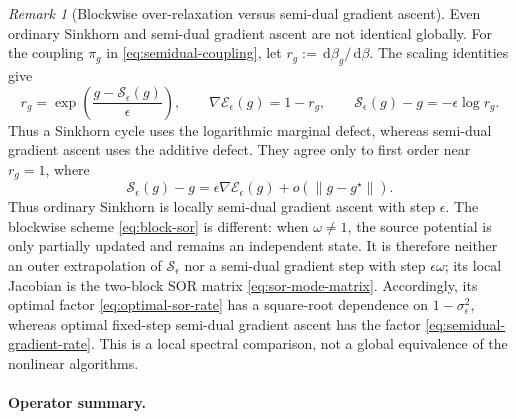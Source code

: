 \documentclass[11pt]{article}
\theoremstyle{definition}
\theoremstyle{remark}
\newtheorem{remark}[proposition]{Remark}
\newcommand{\eps}{\epsilon}
\newcommand{\be}{\beta}
\newcommand{\Ee}{\mathcal{E}}
\newcommand{\Ss}{\mathcal{S}}
\newcommand{\dd}{\,\mathrm{d}}
\newcommand{\norm}[1]{\left\lVert #1\right\rVert}
\begin{document}
\begin{remark}[Blockwise over-relaxation versus semi-dual gradient ascent]
  \label{rem:sinkhorn-versus-semdual-gradient}
  Even ordinary Sinkhorn and semi-dual gradient ascent are not identical
  globally. For the coupling
  $\pi_g$ in \eqref{eq:semidual-coupling}, let
  $r_g:=\dd\be_g/\dd\be$. The scaling identities give
  \begin{equation}
    \label{eq:sinkhorn-gradient-global-comparison}
    r_g
    =
    \exp\left(\frac{g-\Ss_\eps(g)}{\eps}\right),
    \qquad
    \nabla\Ee_\eps(g)=1-r_g,
    \qquad
    \Ss_\eps(g)-g=-\eps\log r_g.
  \end{equation}
  Thus a Sinkhorn cycle uses the logarithmic marginal defect, whereas
  semi-dual gradient ascent uses the additive defect. They agree only
  to first order near $r_g=1$, where
  \begin{equation}
    \label{eq:sinkhorn-gradient-local-comparison}
    \Ss_\eps(g)-g
    =
    \eps\nabla\Ee_\eps(g)
    +o(\norm{g-g^\star}).
  \end{equation}
  Thus ordinary Sinkhorn is locally semi-dual gradient ascent with step
  $\eps$. The blockwise scheme \eqref{eq:block-sor} is different: when
  $\omega\neq1$, the source potential is only partially updated and
  remains an independent state. It is therefore neither an outer
  extrapolation of $\Ss_\eps$ nor a semi-dual gradient step with step
  $\eps\omega$; its local Jacobian is the two-block SOR matrix
  \eqref{eq:sor-mode-matrix}. Accordingly, its optimal factor
  \eqref{eq:optimal-sor-rate} has a square-root dependence on
  $1-\sigma_\eps^2$, whereas optimal fixed-step semi-dual gradient
  ascent has the factor \eqref{eq:semidual-gradient-rate}. This is a
  local spectral comparison, not a global equivalence of the nonlinear
  algorithms.
\end{remark}

\paragraph{Operator summary.}
\end{document}
